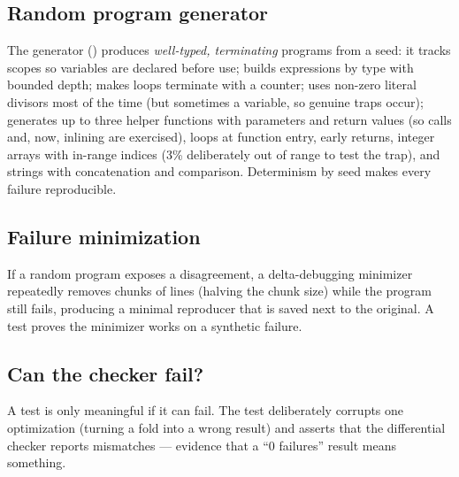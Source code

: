 \subsection{Random program generator}
The generator () produces \emph{well-typed, terminating} programs from a seed: it tracks scopes so variables are declared before use; builds expressions by type with bounded depth; makes loops terminate with a counter; uses non-zero literal divisors most of the time (but sometimes a variable, so genuine traps occur); generates up to three helper functions with parameters and return values (so calls and, now, inlining are exercised), loops at function entry, early returns, integer arrays with in-range indices (3\% deliberately out of range to test the trap), and strings with concatenation and comparison. Determinism by seed makes every failure reproducible.

\subsection{Failure minimization}
If a random program exposes a disagreement, a delta-debugging minimizer repeatedly removes chunks of lines (halving the chunk size) while the program still fails, producing a minimal reproducer that is saved next to the original. A test proves the minimizer works on a synthetic failure.

\subsection{Can the checker fail?}
A test is only meaningful if it can fail. The test  deliberately corrupts one optimization (turning a fold into a wrong result) and asserts that the differential checker reports mismatches --- evidence that a ``0 failures'' result means something.


